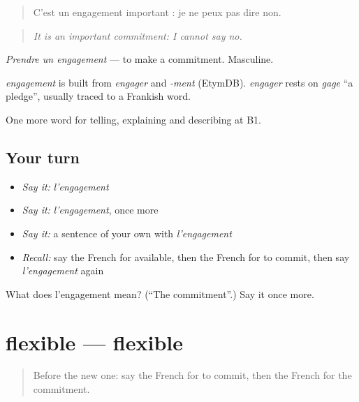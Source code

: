 \begin{quote}
C'est un engagement important : je ne peux pas dire non.
\end{quote}

\begin{quote}
\emph{It is an important commitment: I cannot say no.}
\end{quote}

\emph{Prendre un engagement} — to make a commitment. Masculine.

\begin{cousinweb}
\emph{engagement} is built from \emph{engager} and \emph{-ment} (EtymDB). \emph{engager} rests on \emph{gage} \textquotedblleft{}a pledge\textquotedblright{}, usually traced to a Frankish word.
\end{cousinweb}

\begin{grammarlens}[title={What you've built}]
One more word for telling, explaining and describing at B1.
\end{grammarlens}

\subsection*{Your turn}
\begin{itemize}
\raggedright
  \item \emph{Say it:} \emph{l'engagement}
  \item \emph{Say it:} \emph{l'engagement}, once more
  \item \emph{Say it:} a sentence of your own with \emph{l'engagement}
  \item \emph{Recall:} say the French for available, then the French for to commit, then say \emph{l'engagement} again
\end{itemize}

\begin{tcolorbox}[breakable,colback=teal!4,colframe=teal!35!black,title={Before you move on}]
What does l'engagement mean? (\textquotedblleft{}The commitment\textquotedblright{}.) Say it once more.
\end{tcolorbox}
\section[flexible]{flexible — flexible}

\label{lesson:FR-C373-flexible}



\begin{quote}
Before the new one: say the French for to commit, then the French for the commitment.
\end{quote}

